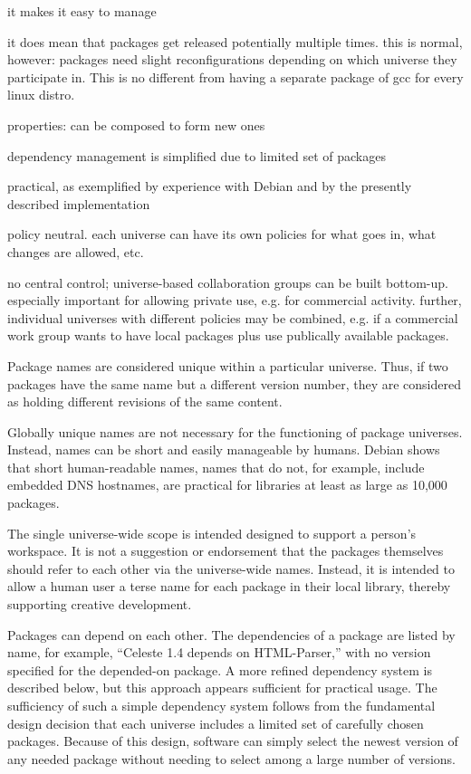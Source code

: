 \documentclass{article}
\begin{document}
    it makes it easy to manage

    it does mean that packages get released potentially multiple times.
    this is normal, however: packages need slight reconfigurations depending
    on which universe they participate in.  This is no different from
    having a separate package of gcc for every linux distro.

properties:
  can be composed to form new ones

  dependency management is simplified due to limited set of packages

  practical, as exemplified by experience with Debian and by
  the presently described implementation

  policy neutral.  each universe can have its own policies for
  what goes in, what changes are allowed, etc.

  no central control; universe-based collaboration groups
  can be built bottom-up.  especially important for allowing
  private use, e.g. for commercial activity.  further, individual
  universes with different policies may be combined, e.g. if a
  commercial work group wants to have local packages plus use
  publically available packages.
   

Package names are considered unique within a particular universe.
Thus, if two packages have the same name but a different version
number, they are considered as holding different revisions of the same
content.

Globally unique names are not necessary for the functioning of package
universes.  Instead, names can be short and easily manageable by
humans.  Debian shows that short human-readable names, names that do
not, for example, include embedded DNS hostnames, are practical for
libraries at least as large as 10,000 packages.

The single universe-wide scope is intended designed to support a
person's workspace. It is not a suggestion or endorsement that the
packages themselves should refer to each other via the universe-wide
names.  Instead, it is intended to allow a human user a terse name for
each package in their local library, thereby supporting creative
development.


Packages can depend on each other.  The dependencies of a package are
listed by name, for example, ``Celeste 1.4 depends on HTML-Parser,''
with no version specified for the depended-on package.  A more refined
dependency system is described below, but this approach appears
sufficient for practical usage.  The sufficiency of such a simple
dependency system follows from the fundamental design decision that
each universe includes a limited set of carefully chosen packages.
Because of this design, software can simply select the newest version
of any needed package without needing to select among a large number
of versions.
\end{document}
